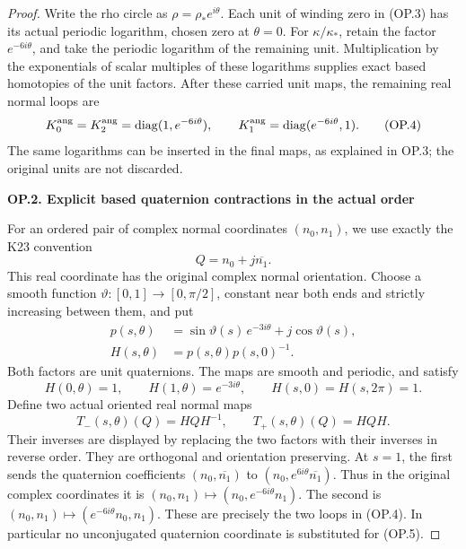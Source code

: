 \begin{proof}
Write the rho circle as \(\rho=\rho_*e^{i\theta}\). Each unit of
winding zero in (OP.3) has its actual periodic logarithm, chosen zero
at \(\theta=0\). For \(\kappa/\kappa_*\), retain the factor
\(e^{-6i\theta}\), and take the periodic logarithm of the remaining
unit. Multiplication by the exponentials of scalar multiples of these
logarithms supplies exact based homotopies of the unit factors. After
these carried unit maps, the remaining real normal loops are
\[
 K_0^{\rm ang}=K_2^{\rm ang}
        =\operatorname{diag}(1,e^{-6i\theta}),\qquad
 K_1^{\rm ang}=\operatorname{diag}(e^{-6i\theta},1).
                                                               \tag{OP.4}
\]
The same logarithms can be inserted in the final maps, as explained
in OP.3; the original units are not discarded.

\par

\medskip\noindent\textbf{OP.2. Explicit based quaternion contractions in the actual order}

\par\nobreak

For an ordered pair of complex normal coordinates \((n_0,n_1)\),
we use exactly the K23 convention
\[
                         Q=n_0+j\overline{n_1}.       \tag{OP.5}
\]
This real coordinate has the original complex normal orientation.
Choose a smooth function \(\vartheta:[0,1]\to[0,\pi/2]\), constant
near both ends and strictly increasing between them, and put
\[
 \begin{aligned}
 p(s,\theta)&=\sin\vartheta(s)\,e^{-3i\theta}
                                      +j\cos\vartheta(s),\\
 H(s,\theta)&=p(s,\theta)p(s,0)^{-1}.
 \end{aligned}                                               \tag{OP.6}
\]
Both factors are unit quaternions. The maps are smooth and periodic,
and satisfy
\[
 H(0,\theta)=1,\qquad H(1,\theta)=e^{-3i\theta},\qquad
 H(s,0)=H(s,2\pi)=1.                                  \tag{OP.7}
\]
Define two actual oriented real normal maps
\[
    T_-(s,\theta)(Q)=H QH^{-1},\qquad
    T_+(s,\theta)(Q)=H QH.                            \tag{OP.8}
\]
Their inverses are displayed by replacing the two factors with their
inverses in reverse order. They are orthogonal and orientation
preserving. At \(s=1\), the first sends the quaternion coefficients
\((n_0,\overline{n_1})\) to
\((n_0,e^{6i\theta}\overline{n_1})\). Thus in the original complex
coordinates it is
\((n_0,n_1)\mapsto(n_0,e^{-6i\theta}n_1)\).
The second is \((n_0,n_1)\mapsto(e^{-6i\theta}n_0,n_1)\).
These are precisely the two loops in (OP.4). In particular no
unconjugated quaternion coordinate is substituted for (OP.5).


\end{proof}
